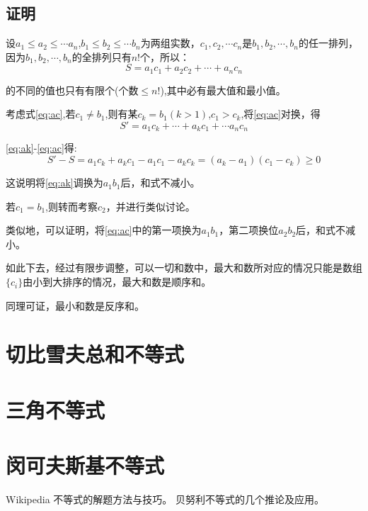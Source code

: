 \documentclass[a4paper]{article} %
\numberwithin{equation}{section} %
\begin{document}
\subsection{证明}
设$a_1\le a_2\le \cdots a_n$,$b_1\le b_2\le \cdots b_n$为两组实数，$c_1,c_2,\cdots c_n$是$b_1,b_2,\cdots,b_n$的任一排列，因为$b_1,b_2,\cdots,b_n$的全排列只有$n!$个，所以：
\begin{equation}
S=a_1c_1+a_2c_2+\cdots+a_nc_n \label{eq:ac}
\end{equation}

的不同的值也只有有限个(个数$\le n!$),其中必有最大值和最小值。

考虑式\eqref{eq:ac},若$c_1\neq b_1$,则有某$c_k=b_1(k>1)$,$c_1>c_k$,将\eqref{eq:ac}对换，得
\begin{equation}
S'=a_1c_k+\cdots +a_kc_1+\cdots a_nc_n \label{eq:ak}
\end{equation}

\eqref{eq:ak}-\eqref{eq:ac}得:
\begin{equation}
S'-S=a_1c_k+a_kc_1-a_1c_1-a_kc_k=(a_k-a_1)(c_1-c_k)\ge 0
\end{equation}

这说明将\eqref{eq:ak}调换为$a_1b_1$后，和式不减小。

若$c_1=b_1$,则转而考察$c_2$，并进行类似讨论。

类似地，可以证明，将\eqref{eq:ac}中的第一项换为$a_1b_1$，第二项换位$a_2b_2$后，和式不减小。

如此下去，经过有限步调整，可以一切和数中，最大和数所对应的情况只能是数组$\{c_i\}$由小到大排序的情况，最大和数是顺序和。

同理可证，最小和数是反序和。


\section{切比雪夫总和不等式}

\section{三角不等式}

\section{闵可夫斯基不等式}


\begin{thebibliography}{99}
Wikipedia
不等式的解题方法与技巧。
贝努利不等式的几个推论及应用。
\end{thebibliography}
\end{document}
